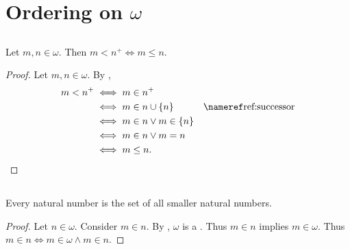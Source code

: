 \documentclass{report}
\begin{document}
\section{Ordering on \texorpdfstring{$\omega$}{Natural Numbers}}%

\subsection{}%

\begin{lemma}

  Let $m, n \in \omega$.
  Then $m < n^+ \iff m \leq n$.

\end{lemma}

\begin{proof}


  Let $m, n \in \omega$.
  By ,
    \begin{align*}
      m < n^+
        & \iff m \in n^+ \\
        & \iff m \in n \cup \{n\} & \textref{ref:successor} \\
        & \iff m \in n \lor m \in \{n\} \\
        & \iff m \in n \lor m = n \\
        & \iff m \leq n.
    \end{align*}

\end{proof}

\subsection{}%

\begin{lemma}

  Every natural number is the set of all smaller natural numbers.

\end{lemma}

\begin{proof}

  Let $n \in \omega$.
  Consider $m \in n$.
  By , $\omega$ is a .
  Thus $m \in n$ implies $m \in \omega$.
  Thus $m \in n \iff m \in \omega \land m \in n$.

\end{proof}
\end{document}
